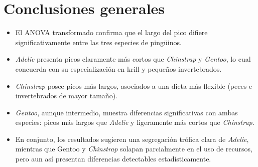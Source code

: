 \documentclass[
  spanish,
  11pt,
  a4paper,
  DIV=11,
  numbers=noendperiod]{scrartcl}
\begin{document}
\section{Conclusiones generales}\label{conclusiones-generales-1}

\begin{itemize}
\item
  El ANOVA transformado confirma que el largo del pico difiere
  significativamente entre las tres especies de pingüinos.
\item
  \emph{Adelie} presenta picos claramente más cortos que
  \emph{Chinstrap} y \emph{Gentoo}, lo cual concuerda con su
  especialización en krill y pequeños invertebrados.
\item
  \emph{Chinstrap} posee picos más largos, asociados a una dieta más
  flexible (peces e invertebrados de mayor tamaño).
\item
  \emph{Gentoo}, aunque intermedio, muestra diferencias significativas
  con ambas especies: picos más largos que \emph{Adelie} y ligeramente
  más cortos que \emph{Chinstrap}.
\item
  En conjunto, los resultados sugieren una segregación trófica clara de
  \emph{Adelie}, mientras que Gentoo y \emph{Chinstrap} solapan
  parcialmente en el uso de recursos, pero aun así presentan diferencias
  detectables estadísticamente.
\end{itemize}
\end{document}
